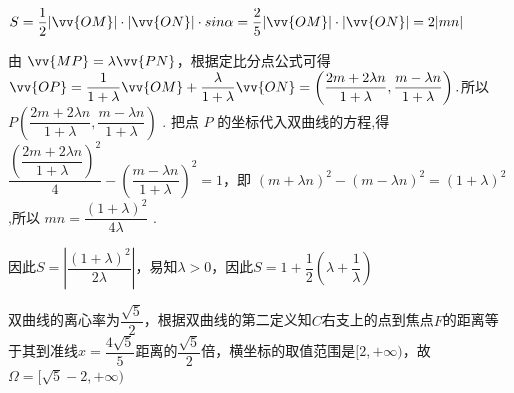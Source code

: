 \begin{enumerate}
\begin{enumerate}
\begin{jieda}
\begin{enumerate}
                $S = \dfrac{1}{2}|\vv{OM}|\cdot |\vv{ON}| \cdot sin\alpha = \dfrac{2}{5}|\vv{OM}|\cdot |\vv{ON}| = 2|mn|$
                
                由 $\vv{MP} = \lambda \vv{PN}$，根据定比分点公式可得 $\vv{OP} = \dfrac{1}{1 + \lambda }\vv{OM} + \dfrac{\lambda }{1 + \lambda }\vv{ON} = \left( {\dfrac{{2m} + {2\lambda n}}{1 + \lambda },\dfrac{m - {\lambda n}}{1 + \lambda }}\right) .$所以 $P\left( {\dfrac{{2m} + {2\lambda n}}{1 + \lambda },\dfrac{m - {\lambda n}}{1 + \lambda }}\right)$ . 把点 $P$ 的坐标代入双曲线的方程,得$\dfrac{{\left( \dfrac{{2m} + {2\lambda n}}{1 + \lambda }\right) }^{2}}{4} - {\left( \dfrac{m - {\lambda n}}{1 + \lambda }\right) }^{2} = 1$，即 ${\left( m + \lambda n\right) }^{2} - {\left( m - \lambda n\right) }^{2} = {\left( 1 + \lambda \right) }^{2}$ ,所以 ${mn} = \dfrac{{\left( 1 + \lambda \right) }^{2}}{4\lambda }$ . 
    
                因此$S = \left|\dfrac{(1+\lambda)^2}{2\lambda}\right|$，易知$\lambda > 0$，因此$S = 1 + \dfrac{1}{2}\left( {\lambda  + \dfrac{1}{\lambda }}\right)$
    
                双曲线的离心率为$\dfrac{\sqrt{5}}{2}$，根据双曲线的第二定义知$C$右支上的点到焦点$F$的距离等于其到准线$x = \dfrac{4\sqrt{5}}{5}$距离的$\dfrac{\sqrt{5}}{2}$倍，横坐标的取值范围是$[2, +\infty)$，故$\Omega = [\sqrt{5}-2, +\infty)$
    

\end{enumerate}
\end{jieda}
\end{enumerate}
\end{enumerate}
